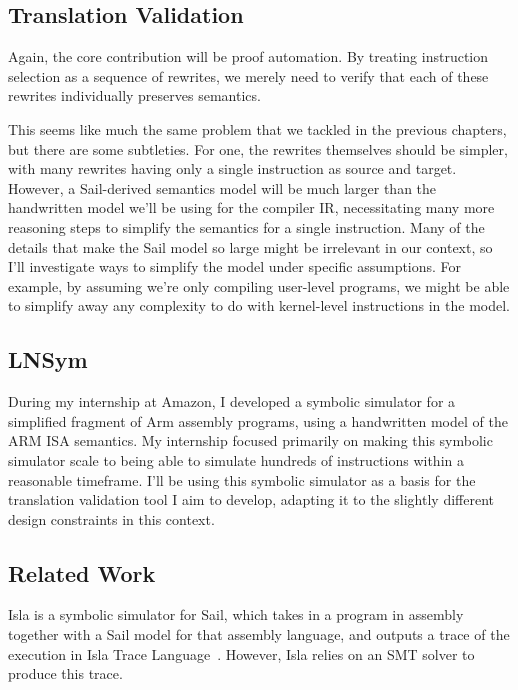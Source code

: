 \documentclass[a4paper]{scrartcl}
\begin{document}
\subsection{Translation Validation}\label{translation-validation}

Again, the core contribution will be proof automation. By treating
instruction selection as a sequence of rewrites, we merely need to
verify that each of these rewrites individually preserves semantics.

This seems like much the same problem that we tackled in the previous
chapters, but there are some subtleties. For one, the rewrites
themselves should be simpler, with many rewrites having only a single
instruction as source and target. However, a Sail-derived semantics
model will be much larger than the handwritten model we'll be using for
the compiler IR, necessitating many more reasoning steps to simplify the
semantics for a single instruction. Many of the details that make the
Sail model so large might be irrelevant in our context, so I'll
investigate ways to simplify the model under specific assumptions. For
example, by assuming we're only compiling user-level programs, we might
be able to simplify away any complexity to do with kernel-level
instructions in the model.

\subsection{LNSym}\label{lnsym}

During my internship at Amazon, I developed a symbolic simulator for a
simplified fragment of Arm assembly programs, using a handwritten model
of the ARM ISA semantics. My internship focused primarily on making this
symbolic simulator scale to being able to simulate hundreds of
instructions within a reasonable timeframe. I'll be using this symbolic
simulator as a basis for the translation validation tool I aim to
develop, adapting it to the slightly different design constraints in
this context. 

\subsection{Related Work}\label{related-work}

Isla is a symbolic simulator for Sail, which takes in a program in assembly 
together with a Sail model for that assembly language, and outputs a trace of the
execution in Isla Trace Language~\cite{armstrongIslaIntegratingFullScale2021}.
However, Isla relies on an SMT solver to produce this trace.
\end{document}

